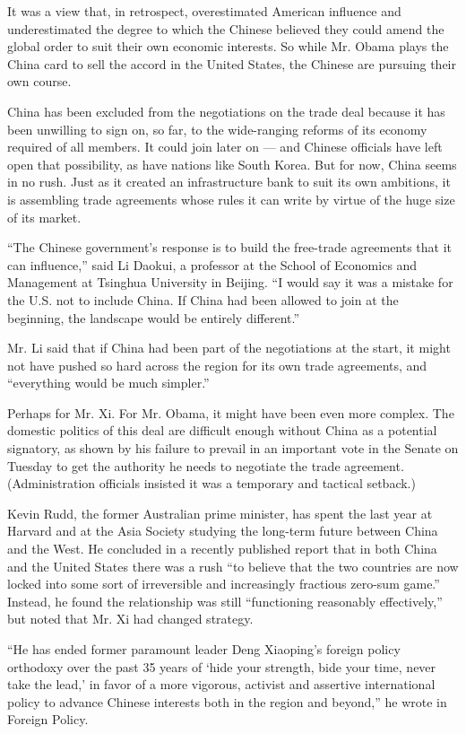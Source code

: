 It was a view that, in retrospect, overestimated American influence and
underestimated the degree to which the Chinese believed they could amend
the global order to suit their own economic interests. So while Mr.
Obama plays the China card to sell the accord in the United States, the
Chinese are pursuing their own course.

China has been excluded from the negotiations on the trade deal because
it has been unwilling to sign on, so far, to the wide-ranging reforms of
its economy required of all members. It could join later on --- and
Chinese officials have left open that possibility, as have nations like
South Korea. But for now, China seems in no rush. Just as it created an
infrastructure bank to suit its own ambitions, it is assembling trade
agreements whose rules it can write by virtue of the huge size of its
market.

``The Chinese government's response is to build the free-trade
agreements that it can influence,'' said Li Daokui, a professor at the
School of Economics and Management at Tsinghua University in Beijing.
``I would say it was a mistake for the U.S. not to include China. If
China had been allowed to join at the beginning, the landscape would be
entirely different.''

Mr. Li said that if China had been part of the negotiations at the
start, it might not have pushed so hard across the region for its own
trade agreements, and ``everything would be much simpler.''

Perhaps for Mr. Xi. For Mr. Obama, it might have been even more complex.
The domestic politics of this deal are difficult enough without China as
a potential signatory, as shown by his failure to prevail in an
important vote in the Senate on Tuesday to get the authority he needs to
negotiate the trade agreement. (Administration officials insisted it was
a temporary and tactical setback.)

Kevin Rudd, the former Australian prime minister, has spent the last
year at Harvard and at the Asia Society studying the long-term future
between China and the West. He concluded in a recently published report
that in both China and the United States there was a rush ``to believe
that the two countries are now locked into some sort of irreversible and
increasingly fractious zero-sum game.'' Instead, he found the
relationship was still ``functioning reasonably effectively,'' but noted
that Mr. Xi had changed strategy.

``He has ended former paramount leader Deng Xiaoping's foreign policy
orthodoxy over the past 35 years of `hide your strength, bide your time,
never take the lead,' in favor of a more vigorous, activist and
assertive international policy to advance Chinese interests both in the
region and beyond,'' he wrote in Foreign Policy.

